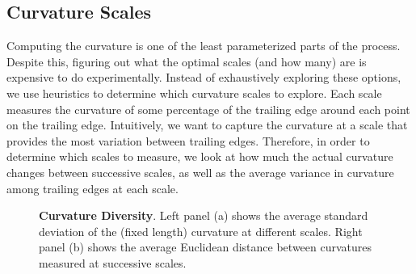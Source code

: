 \subsection{Curvature Scales}

Computing the curvature is one of the least parameterized parts of the process.
Despite this, figuring out what the optimal scales (and how many) are is expensive to do experimentally.
Instead of exhaustively exploring these options, we use heuristics to determine which curvature scales to explore.
Each scale measures the curvature of some percentage of the trailing edge around each point on the trailing edge.
Intuitively, we want to capture the curvature at a scale that provides the most variation between trailing edges.
Therefore, in order to determine which scales to measure, we look at how much the actual curvature changes between successive scales, as well as the average variance in curvature among trailing edges at each scale. 

\begin{figure}[t]%
\centering
{}
%
\caption{\textbf{Curvature Diversity}. Left panel (a) shows the average standard deviation of the (fixed length) curvature at different scales. Right panel (b) shows the average Euclidean distance between curvatures measured at successive scales.}
\label{fig:curvature_diversity}
\end{figure}

